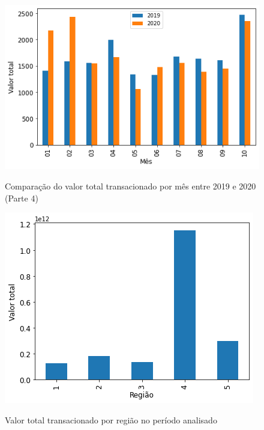 \begin{figure}[htb]
	\centering
    \caption{Comparação do valor total transacionado por mês entre 2019 e 2020 (Parte 4)}
    \includegraphics[scale=0.7]{images/base-de-dados-19.1-comparacao-valor-mensal-total.png}
    \label{fig:pandemia:descritiva-19.1-comparacao-valor-mensal-total}
    \fautor
\end{figure}

\begin{figure}[htb]
	\centering
    \caption{Valor total transacionado por região no período analisado}
    \includegraphics[scale=0.7]{images/base-de-dados-11.1-valor-total-por-regiao.png}
    \label{fig:pandemia:descritiva-11.1-valor-total-por-regiao}
    \fautor
\end{figure}

